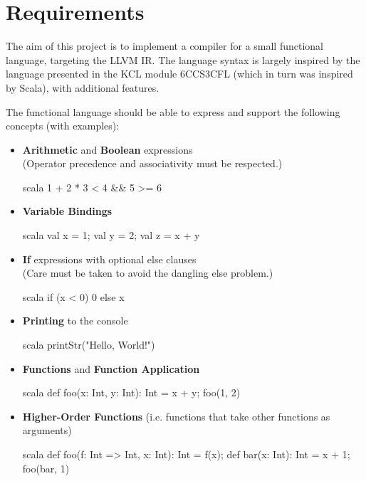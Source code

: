 \chapter{Requirements}
\label{ch:requirements}

The aim of this project is to implement a compiler for a small functional language, targeting the
LLVM IR. The language syntax is largely inspired by the language presented in the KCL module
6CCS3CFL (which in turn was inspired by Scala), with additional features.

The functional language should be able to express and support the following concepts (with
examples):

\begin{itemize}
      \item \textbf{Arithmetic} and \textbf{Boolean} expressions \\
            (Operator precedence and associativity must be respected.)
            \begin{code}{scala}
                  1 + 2 * 3 < 4 && 5 >= 6
            \end{code}

      \item \textbf{Variable Bindings}
            \begin{code}{scala}
                  val x = 1; val y = 2; val z = x + y
            \end{code}

      \item \textbf{If} expressions with optional else clauses \\
            (Care must be taken to avoid the dangling else problem.)
            \begin{code}{scala}
                  if (x < 0) 0 else x
            \end{code}

      \item \textbf{Printing} to the console
            \begin{code}{scala}
                  printStr("Hello, World!")
            \end{code}

      \item \textbf{Functions} and \textbf{Function Application}
            \begin{code}{scala}
                  def foo(x: Int, y: Int): Int = x + y;
                  foo(1, 2)
            \end{code}

      \item \textbf{Higher-Order Functions} (i.e. functions that take other functions as arguments)
            \begin{code}{scala}
                  def foo(f: Int => Int, x: Int): Int = f(x);
                  def bar(x: Int): Int = x + 1;
                  foo(bar, 1)
            \end{code}


\end{itemize}

